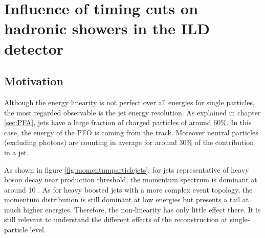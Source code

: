 \section{Influence of timing cuts on hadronic showers in the ILD detector}
\label{sec:MCLevelILDTiming}

\subsection{Motivation}

Although the energy linearity is not perfect over all energies for single particles, the most regarded observable is the jet energy resolution. As explained in chapter \ref{sec:PFA}, jets have a large fraction of charged particles of around 60\%. In this case, the energy of the PFO is coming from the track. Moreover neutral particles (excluding photons) are counting in average for around 30\% of the contribution in a jet.

As shown in figure \ref{fig:momentumparticlejets}, for jets representative of heavy boson decay near production threshold, the momentum spectrum is dominant at around 10 \GeV. As for heavy boosted jets with a more complex event topology, the momentum distribution is still dominant at low energies but presents a tail at much higher energies. Therefore, the non-linearity has only little effect there. It is still relevant to understand the different effects of the reconstruction at single-particle level.

